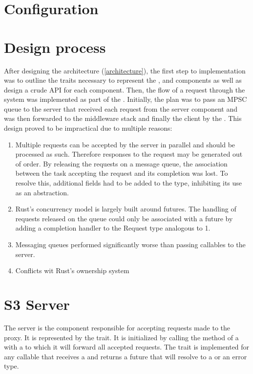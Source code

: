 \section{Configuration}
\label{configuration}


\section{Design process}

After designing the architecture (\ref{architecture}), the first step to implementation was to outline the traits necessary to represent the ,  and  components as well as design a crude API for each component. Then, the flow of a request through the system was implemented as part of the . Initially, the plan was to pass an MPSC queue to the server that received each request from the server component and was then forwarded to the middleware stack and finally the client by the . This design proved to be impractical due to multiple reasons:
\begin{enumerate}
	\item Multiple requests can be accepted by the server in parallel and should be processed as such. Therefore responses to the request may be generated out of order. By releasing the requests on a message queue, the association between the task accepting the request and its completion was lost. To resolve this, additional fields had to be added to the  type, inhibiting its use as an abstraction.
	\item Rust's concurrency model is largely built around futures. The handling of requests released on the queue could only be associated with a future by adding a completion handler to the Request type analogous to 1.
	\item Messaging queues performed significantly worse than passing callables to the server.
	\item Conflicts wit Rust's ownership system
\end{enumerate}

\section{S3 Server}

The server is the component responsible for accepting requests made to the proxy. It is represented by the  trait. 
It is initialized by calling the  method of a  with a  to which it will forward all accepted requests. The  trait is implemented for any callable that receives a  and returns a future that will resolve to a  or an error type.


